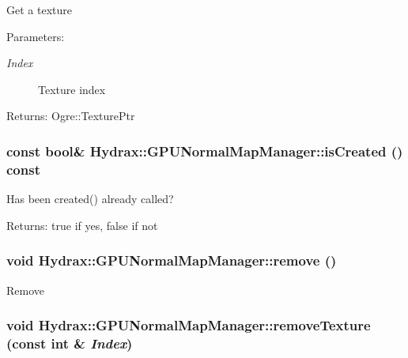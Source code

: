 Get a texture \begin{Desc}
\item[Parameters:]
\begin{description}
\item[{\em Index}]Texture index \end{description}
\end{Desc}
\begin{Desc}
\item[Returns:]Ogre::TexturePtr \end{Desc}
\hypertarget{class_hydrax_1_1_g_p_u_normal_map_manager_08b3f31fd1b4be43a6f0cc8ac0063077}{
\subsubsection[{isCreated}]{\setlength{\rightskip}{0pt plus 5cm}const bool\& Hydrax::GPUNormalMapManager::isCreated () const}}
\label{class_hydrax_1_1_g_p_u_normal_map_manager_08b3f31fd1b4be43a6f0cc8ac0063077}


Has been created() already called? \begin{Desc}
\item[Returns:]true if yes, false if not \end{Desc}
\hypertarget{class_hydrax_1_1_g_p_u_normal_map_manager_3a9a24e5832aaa24f78025d1ba04f8a3}{
\subsubsection[{remove}]{\setlength{\rightskip}{0pt plus 5cm}void Hydrax::GPUNormalMapManager::remove ()}}
\label{class_hydrax_1_1_g_p_u_normal_map_manager_3a9a24e5832aaa24f78025d1ba04f8a3}


Remove \hypertarget{class_hydrax_1_1_g_p_u_normal_map_manager_134fe8bf7ebfbcf75e3a7953a5beb028}{
\subsubsection[{removeTexture}]{\setlength{\rightskip}{0pt plus 5cm}void Hydrax::GPUNormalMapManager::removeTexture (const int \& {\em Index})}}
\label{class_hydrax_1_1_g_p_u_normal_map_manager_134fe8bf7ebfbcf75e3a7953a5beb028}


